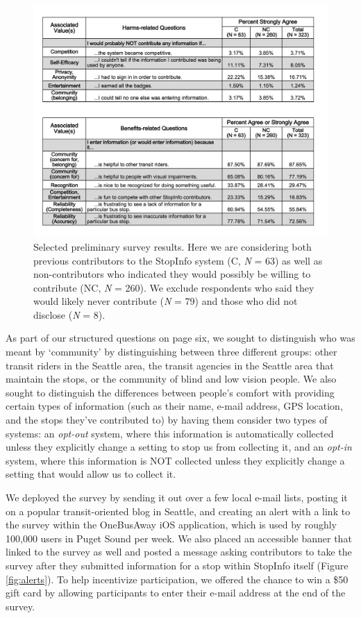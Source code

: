 \begin{figure}[t]
\centering
\includegraphics[width=\textwidth]{Results.png}
\caption{Selected preliminary survey results. Here we are considering both previous contributors to the StopInfo system (C, \emph{N} = 63) as well as non-contributors who indicated they would possibly be willing to contribute (NC, \emph{N} = 260). We exclude respondents who said they would likely never contribute (\emph{N} = 79) and those who did not disclose (\emph{N} = 8).}
\label{fig:results}
\end{figure} 

As part of our structured questions on page six, we sought to distinguish who was meant by `community' by distinguishing between three different groups: other transit riders in the Seattle area, the transit agencies in the Seattle area that maintain the stops, or the community of blind and low vision people. We also sought to distinguish the differences between people's comfort with providing certain types of information (such as their name, e-mail address, GPS location, and the stops they've contributed to) by having them consider two types of systems: an \emph{opt-out} system, where this information is automatically collected unless they explicitly change a setting to stop us from collecting it, and an \emph{opt-in} system, where this information is NOT collected unless they explicitly change a setting that would allow us to collect it.

We deployed the survey by sending it out over a few local e-mail lists, posting it on a popular transit-oriented blog in Seattle, and creating an alert with a link to the survey within the OneBusAway iOS application, which is used by roughly 100,000 users in Puget Sound per week. We also placed an accessible banner that linked to the survey as well and posted a message asking contributors to take the survey after they submitted information for a stop within StopInfo itself (Figure \ref{fig:alerts}). To help incentivize participation, we offered the chance to win a \$50 gift card by allowing participants to enter their e-mail address at the end of the survey. 

